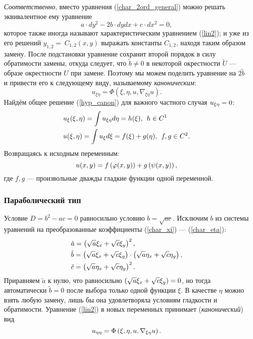     \textit{Соответственно}, вместо уравнения (\ref{char_2ord_general}) можно решать эквивалентное ему уравнение
    \begin{equation}
        a\cdot dy^2 - 2b\cdot dy dx + c\cdot dx^2 = 0, \label{char_2ord}
    \end{equation}
    которое также иногда называют характеристическим уравнением (\ref{lin2}); и уже из его решений $y_{1,2} =~C_{1,2}(x,y)$ выражать константы $C_{1,2}$,
    находя таким образом замену.
    После подстановки уравнение сохранит второй порядок в силу обратимости замены, откуда следует, что $\tilde{b} \not= 0$ в некоторой
    окрестности $\tilde{U}$ --- образе окрестности $U$ при замене. Поэтому мы можем поделить уравнение на $2\tilde{b}$ и привести его к
    следующему виду, называемому \textit{каноническим}:
    \begin{equation}
        u_{\xi\eta} = \Phi(\xi, \eta, u, \nabla_{\xi\eta}u). \label{hyp_canon}
    \end{equation}
    Найдём общее решение (\ref{hyp_canon}) для важного частного случая $u_{\xi\eta} = 0$:
    \begin{align*}
        & u_{\xi}(\xi, \eta) = \int u_{\xi\eta} d\eta = h(\xi), \:\: h \in C^1\\
        & u(\xi, \eta) = \int u_{\xi} d\xi = f(\xi) + g(\eta), \:\: f,g \in C^2.
    \end{align*}
    Возвращаясь к исходным переменным:
    \begin{equation}
        u(x, y) = f\left({\varphi(x,y)}\right) + g\left({\psi(x, y)}\right), \label{waveform_gen_sol}
    \end{equation}
    где $f,g$ --- произвольные дважды гладкие функции одной переменной.

    \subsubsection{Параболический тип}
    Условие $D = b^2 - ac = 0$ равносильно условию $b = \sqrt{ac}$. Исключим $b$ из системы уравнений на преобразованные коэффициенты
    (\ref{char_xi}) --- (\ref{char_eta}):
    \begin{align}
        & \tilde{a} = \left({\sqrt{a}\xi_x + \sqrt{c}\xi_y}\right)^2,\\
        & \tilde{b} = \left({\sqrt{a}\xi_x + \sqrt{c}\xi_y }\right)\cdot\left({\sqrt{a}\eta_x + \sqrt{c}\eta_y}\right),\\
        & \tilde{c} = \left({\sqrt{a}\eta_x + \sqrt{c}\eta_y}\right)^2.
    \end{align}
    Приравняем $\tilde{a}$ к нулю, что равносильно $\left({\sqrt{a}\xi_x + \sqrt{c}\xi_y}\right) = 0$, но тогда автоматически $\tilde{b} = 0$
    после выбора только одной функции $\xi$. В качестве $\eta$ можно взять любую замену, лишь бы она удовлетворяла условиям гладкости и обратимости.
    Уравнение (\ref{lin2}) в новых переменных принимает (\textit{канонический}) вид
    \begin{equation}
        u_{\eta\eta} = \Phi\left({\xi, \eta, u, \nabla_{\xi\eta}u}\right). \label{par_canon}
    \end{equation}
